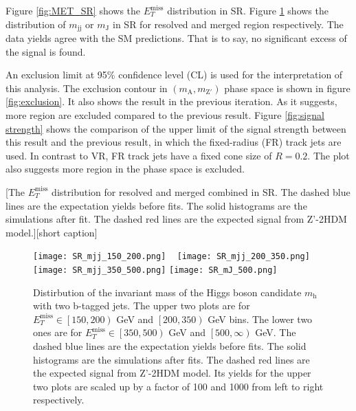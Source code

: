 \documentclass[class=NCU_thesis, crop=false]{standalone}
\begin{document}
		Figure \ref{fig:MET_SR} shows the $E_T^{\mathrm{miss}}$ distribution in SR. Figure \ref{fig:SR_mj} shows the distribution of $m_{\mathrm{jj}}$ or $m_{\mathrm{J}}$ in SR for resolved and merged region respectively. The data yields agree with the SM predictions. That is to say, no significant excess of the signal is found.

		An exclusion limit at 95\% confidence level (CL) is used for the interpretation of this analysis. The exclusion contour in $(m_{\mathrm{A}}, m_{\mathrm{Z'}})$ phase space is shown in figure \ref{fig:exclusion}. It also shows the result in the previous iteration. As it suggests, more region are excluded compared to the previous result. Figure \ref{fig:signal strength} shows the comparison of the upper limit of the signal strength between this result and the previous result, in which the fixed-radius (FR) track jets are used. In contrast to VR, FR track jets have a fixed cone size of $R = 0.2$. The plot also suggests more region in the phase space is excluded.

		[The $E_T^{\mathrm{miss}}$ distribution for resolved and merged combined in SR. The dashed blue lines are the expectation yields before fits. The solid histograms are the simulations after fit. The dashed red lines are the expected signal from Z'-2HDM model.][short caption]

		\begin{figure}[!hbt]
			\centering
			\subcaptionbox
			{\label{fig:subfig_SR_mjj_150_200}}
			{\texttt{[image: SR\_mjj\_150\_200.png]}}
			~
			\subcaptionbox
			{\label{fig:subfig_SR_mjj_200_350}}
			{\texttt{[image: SR\_mjj\_200\_350.png]}}
			\vspace{\baselineskip} %
			\subcaptionbox
			{\label{fig:subfig_SR_mjj_350_500}}
			{\texttt{[image: SR\_mjj\_350\_500.png]}}
			\subcaptionbox
			{\label{fig:subfig_SR_mJ_500}}
			{\texttt{[image: SR\_mJ\_500.png]}}
			\caption{Distirbution of the invariant mass of the Higgs boson candidate $m_{\mathrm{h}}$ with two b-tagged jets. The upper two plots are for $E_T^{\mathrm{miss}} \in \left[150, 200\right)$ GeV and $\left[200, 350\right)$ GeV bins. The lower two ones are for $E_T^{\mathrm{miss}} \in \left[350, 500\right)$ GeV and $\left[500, \infty \right)$ GeV. The dashed blue lines are the expectation yields before fits. The solid histograms are the simulations after fits. The dashed red lines are the expected signal from Z'-2HDM model. Its yields for the upper two plots are scaled up by a factor of 100 and 1000 from left to right respectively.}
			\label{fig:SR_mj}
		\end{figure}
\end{document}
